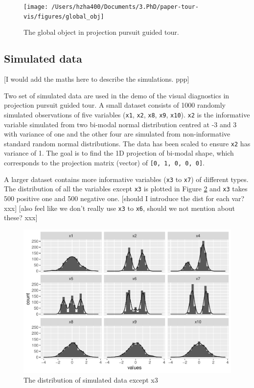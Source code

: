 \documentclass[12pt]{article}
\begin{document}
\begin{figure}
\texttt{[image: /Users/hzha400/Documents/3.PhD/paper-tour-vis/figures/global\_obj]} \caption{\label{glb-obj}The global object in projection pursuit guided tour.}\label{fig:glb-obj}
\end{figure}

\hypertarget{simulated-data}{%
\subsection{Simulated data}\label{simulated-data}}

{[}I would add the maths here to describe the simulations. ppp{]}

Two set of simulated data are used in the demo of the visual diagnostics
in projection pursuit guided tour. A small dataset consists of 1000
randomly simulated observations of five variables (\texttt{x1},
\texttt{x2}, \texttt{x8}, \texttt{x9}, \texttt{x10}). \texttt{x2} is the
informative variable simulated from two bi-modal normal distribution
centred at -3 and 3 with variance of one and the other four are
simulated from non-informative standard random normal distributions. The
data has been scaled to ensure \texttt{x2} has variance of 1. The goal
is to find the 1D projection of bi-modal shape, which corresponds to the
projection matrix (vector) of \texttt{{[}0,\ 1,\ 0,\ 0,\ 0{]}}.

A larger dataset contains more informative variables (\texttt{x3} to
\texttt{x7}) of different types. The distribution of all the variables
except \texttt{x3} is plotted in Figure \ref{origin-data} and
\texttt{x3} takes 500 positive one and 500 negative one. {[}should I
introduce the dist for each var? xxx{]} {[}also feel like we don't
really use \texttt{x3} to \texttt{x6}, should we not mention about
these? xxx{]}

\begin{figure}
\centering
\includegraphics{paper_files/figure-latex/origin-data-1.pdf}
\caption{\label{origin-data} The distribution of simulated data except
x3}
\end{figure}
\end{document}
